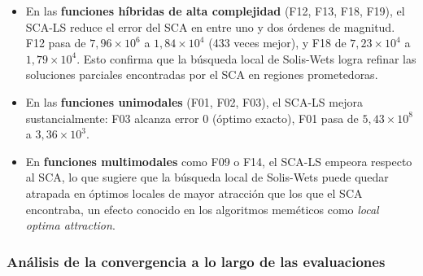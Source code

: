 \documentclass[12pt,a4paper]{article}
\begin{document}
\begin{itemize}
  \item En las \textbf{funciones híbridas de alta complejidad} (F12, F13, F18, F19), el SCA-LS reduce el error del SCA en entre uno y dos órdenes de magnitud. F12 pasa de $7{,}96 \times 10^6$ a $1{,}84 \times 10^4$ (433 veces mejor), y F18 de $7{,}23 \times 10^4$ a $1{,}79 \times 10^4$. Esto confirma que la búsqueda local de Solis-Wets logra refinar las soluciones parciales encontradas por el SCA en regiones prometedoras.
  \item En las \textbf{funciones unimodales} (F01, F02, F03), el SCA-LS mejora sustancialmente: F03 alcanza error 0 (óptimo exacto), F01 pasa de $5{,}43 \times 10^8$ a $3{,}36 \times 10^3$.
  \item En \textbf{funciones multimodales} como F09 o F14, el SCA-LS empeora respecto al SCA, lo que sugiere que la búsqueda local de Solis-Wets puede quedar atrapada en óptimos locales de mayor atracción que los que el SCA encontraba, un efecto conocido en los algoritmos meméticos como \textit{local optima attraction}.
\end{itemize}

\subsubsection{Análisis de la convergencia a lo largo de las evaluaciones}
\end{document}
